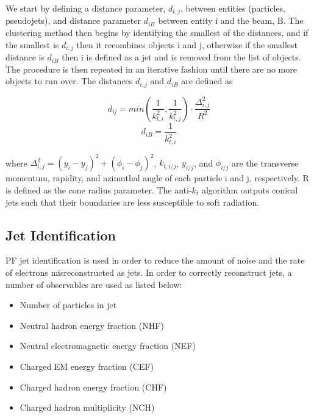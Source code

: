We start by defining a distance parameter, $d_{i,j}$, between entities (particles, pseudojets), and distance parameter $d_{iB}$ between entity i and the beam, B. The clustering method then begins by identifying the smallest of the distances, and if the smallest is $d_{i,j}$ then it recombines objects i and j, otherwise if the smallest distance is $d_{iB}$ then i is defined as a jet and is removed from the list of objects. The procedure is then repeated in an iterative fashion until there are no more objects to run over. The distances $d_{i,j}$ and $d_{iB}$ are defined as

\begin{equation}
d_{ij} = min\left(\frac{1}{k^2_{t,i}}, \frac{1}{k^2_{t,j}} \right) \cdot \frac{\Delta^2_{i,j}}{R^2}
\end{equation}
\begin{equation}
d_{iB} = \frac{1}{k^2_{t,i}}
\end{equation}

where $\Delta^2_{i,j} = (y_i - y_j)^2 + (\phi_i - \phi_j)^2$, $k_{t,i/j}$, $y_{i/j}$, and $\phi_{i/j}$ are the transverse momentum, rapidity, and azimuthal angle of each particle i and j, respectively. R is defined as the cone radius parameter. The anti-$k_t$ algorithm outputs conical jets such that their boundaries are less susceptible to soft radiation.

\subsection{Jet Identification} \label{subsec-JetIdentification}

PF jet identification is used in order to reduce the amount of noise and the rate of electrons misreconstructed as jets. In order to correctly reconstruct jets, a number of observables are used as listed below:

\begin{itemize}
	\item Number of particles in jet 
	\item Neutral hadron energy fraction (NHF) 
	\item Neutral electromagnetic energy fraction (NEF)
	\item Charged EM energy fraction (CEF)
	\item Charged hadron energy fraction (CHF)
	\item Charged hadron multiplicity (NCH)
\end{itemize}	


